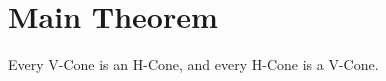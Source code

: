 \documentclass[a4,fleqn]{article}
\begin{document}






\section{Main Theorem}
\begin{theorem}{\label{theorem:mwtc}
  Every V-Cone is an H-Cone, and every H-Cone is a V-Cone.
} \end{theorem}



%
%
%
%
%
%
%
%
%
%
%
%
%
\end{document}
